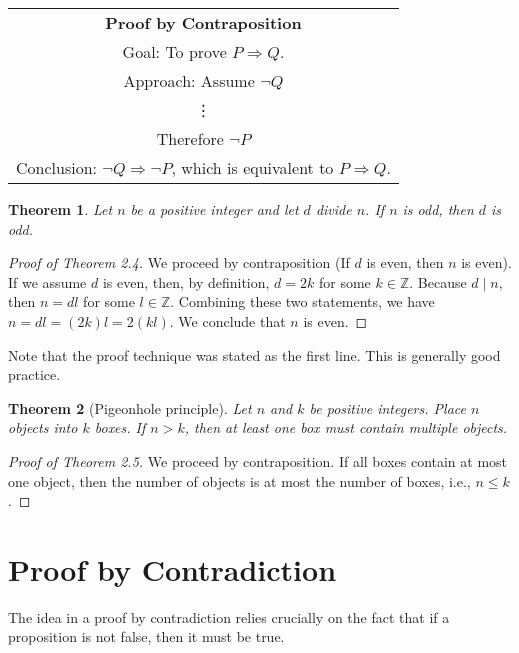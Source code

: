 \documentclass[12pt,a4paper]{article}
\newtheorem{theorem}{Theorem}[section]
\theoremstyle{definition}
\begin{document}
\begin{center}
\begin{tabular}{|c|}
\hline 
\textbf{Proof by Contraposition} \\ 
Goal: To prove $P\Rightarrow Q$. \\ 
Approach: Assume $\neg Q$ \\ 
\vdots \\ 
Therefore $\neg P$ \\ 
Conclusion: $\neg Q\Rightarrow\neg P$, which is equivalent to $P\Rightarrow Q$. \\ 
\hline 
\end{tabular} 
\end{center}

\begin{theorem}\label{thm2.4}
Let $n$ be a positive integer and let $d$ divide $n$. If $n$ is odd, then $d$ is odd.
\end{theorem}

\begin{proof}[Proof of Theorem 2.4]
We proceed by contraposition (If $d$ is even, then $n$ is even). If we assume $d$ is even, then, by definition, $d=2k$ for some $k\in\mathbb{Z}$. Because $d\mid n$, then $n=dl$ for some $l\in\mathbb{Z}$. Combining these two statements, we have $n=dl=(2k)l=2(kl)$. We conclude that $n$ is even.
\end{proof}

Note that the proof technique was stated as the first line. This is generally good practice.

\begin{theorem}[Pigeonhole principle]\label{thm2.5}
Let $n$ and $k$ be positive integers. Place $n$ objects into $k$ boxes. If $n>k$, then at least one box must contain multiple objects.
\end{theorem}

\begin{proof}[Proof of Theorem 2.5]
We proceed by contraposition. If all boxes contain at most one object, then the number of objects is at most the number of boxes, i.e., $n\leq k$.
\end{proof}

\section*{Proof by Contradiction}
The idea in a proof by contradiction relies crucially on the fact that if a proposition is not false, then it must be true.
\end{document}
